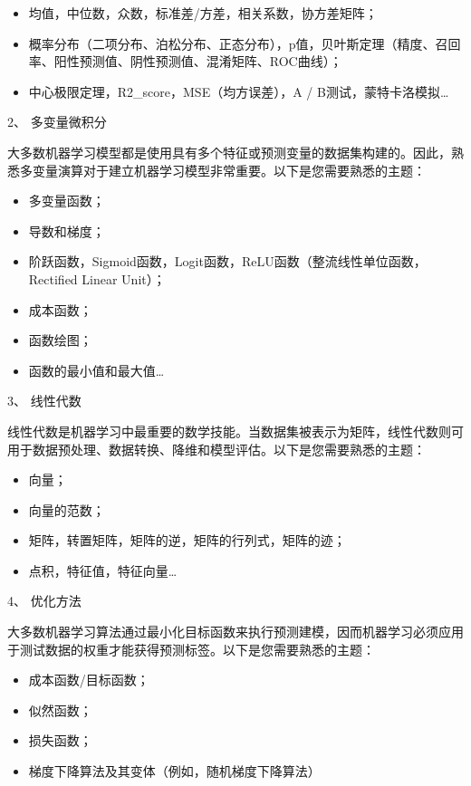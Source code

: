 \documentclass[]{ctexbook}
\begin{document}
\begin{itemize}
\item
  均值，中位数，众数，标准差/方差，相关系数，协方差矩阵；
\item
  概率分布（二项分布、泊松分布、正态分布），p值，贝叶斯定理（精度、召回率、阳性预测值、阴性预测值、混淆矩阵、ROC曲线）；
\item
  中心极限定理，R2\_score，MSE（均方误差），A / B测试，蒙特卡洛模拟\ldots{}
\end{itemize}

2、 多变量微积分

大多数机器学习模型都是使用具有多个特征或预测变量的数据集构建的。因此，熟悉多变量演算对于建立机器学习模型非常重要。以下是您需要熟悉的主题：

\begin{itemize}
\item
  多变量函数；
\item
  导数和梯度；
\item
  阶跃函数，Sigmoid函数，Logit函数，ReLU函数（整流线性单位函数，Rectified Linear Unit）；
\item
  成本函数；
\item
  函数绘图；
\item
  函数的最小值和最大值\ldots{}
\end{itemize}

3、 线性代数

线性代数是机器学习中最重要的数学技能。当数据集被表示为矩阵，线性代数则可用于数据预处理、数据转换、降维和模型评估。以下是您需要熟悉的主题：

\begin{itemize}
\item
  向量；
\item
  向量的范数；
\item
  矩阵，转置矩阵，矩阵的逆，矩阵的行列式，矩阵的迹；
\item
  点积，特征值，特征向量\ldots{}
\end{itemize}

4、 优化方法

大多数机器学习算法通过最小化目标函数来执行预测建模，因而机器学习必须应用于测试数据的权重才能获得预测标签。以下是您需要熟悉的主题：

\begin{itemize}
\item
  成本函数/目标函数；
\item
  似然函数；
\item
  损失函数；
\item
  梯度下降算法及其变体（例如，随机梯度下降算法）
\end{itemize}
\end{document}
